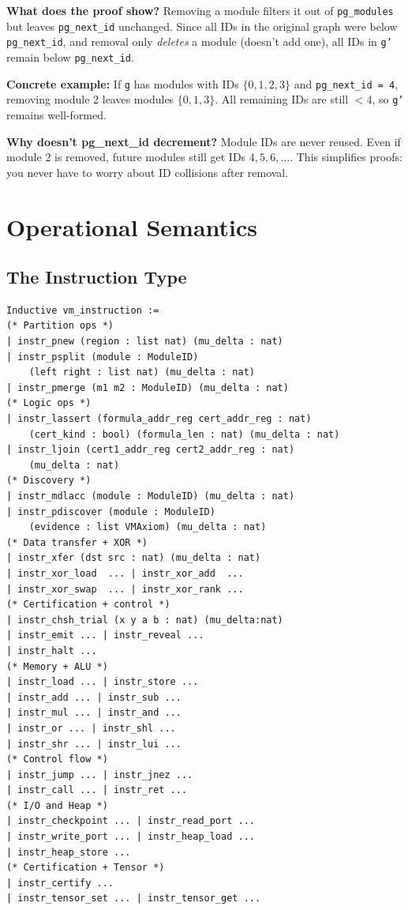 \textbf{What does the proof show?} Removing a module filters it out of \texttt{pg\_modules} but leaves \texttt{pg\_next\_id} unchanged. Since all IDs in the original graph were below \texttt{pg\_next\_id}, and removal only \textit{deletes} a module (doesn't add one), all IDs in \texttt{g'} remain below \texttt{pg\_next\_id}.

\textbf{Concrete example:} If \texttt{g} has modules with IDs $\{0, 1, 2, 3\}$ and \texttt{pg\_next\_id = 4}, removing module 2 leaves modules $\{0, 1, 3\}$. All remaining IDs are still $< 4$, so \texttt{g'} remains well-formed.

\textbf{Why doesn't pg\_next\_id decrement?} Module IDs are never reused. Even if module 2 is removed, future modules still get IDs $4, 5, 6, \dots$. This simplifies proofs: you never have to worry about ID collisions after removal.


\section{Operational Semantics}

\subsection{The Instruction Type}

\begin{lstlisting}
Inductive vm_instruction :=
(* Partition ops *)
| instr_pnew (region : list nat) (mu_delta : nat)
| instr_psplit (module : ModuleID)
    (left right : list nat) (mu_delta : nat)
| instr_pmerge (m1 m2 : ModuleID) (mu_delta : nat)
(* Logic ops *)
| instr_lassert (formula_addr_reg cert_addr_reg : nat)
    (cert_kind : bool) (formula_len : nat) (mu_delta : nat)
| instr_ljoin (cert1_addr_reg cert2_addr_reg : nat)
    (mu_delta : nat)
(* Discovery *)
| instr_mdlacc (module : ModuleID) (mu_delta : nat)
| instr_pdiscover (module : ModuleID)
    (evidence : list VMAxiom) (mu_delta : nat)
(* Data transfer + XOR *)
| instr_xfer (dst src : nat) (mu_delta : nat)
| instr_xor_load  ... | instr_xor_add  ...
| instr_xor_swap  ... | instr_xor_rank ...
(* Certification + control *)
| instr_chsh_trial (x y a b : nat) (mu_delta:nat)
| instr_emit ... | instr_reveal ...
| instr_halt ...
(* Memory + ALU *)
| instr_load ... | instr_store ...
| instr_add ... | instr_sub ...
| instr_mul ... | instr_and ...
| instr_or ... | instr_shl ...
| instr_shr ... | instr_lui ...
(* Control flow *)
| instr_jump ... | instr_jnez ...
| instr_call ... | instr_ret ...
(* I/O and Heap *)
| instr_checkpoint ... | instr_read_port ...
| instr_write_port ... | instr_heap_load ...
| instr_heap_store ...
(* Certification + Tensor *)
| instr_certify ...
| instr_tensor_set ... | instr_tensor_get ...
\end{lstlisting}


